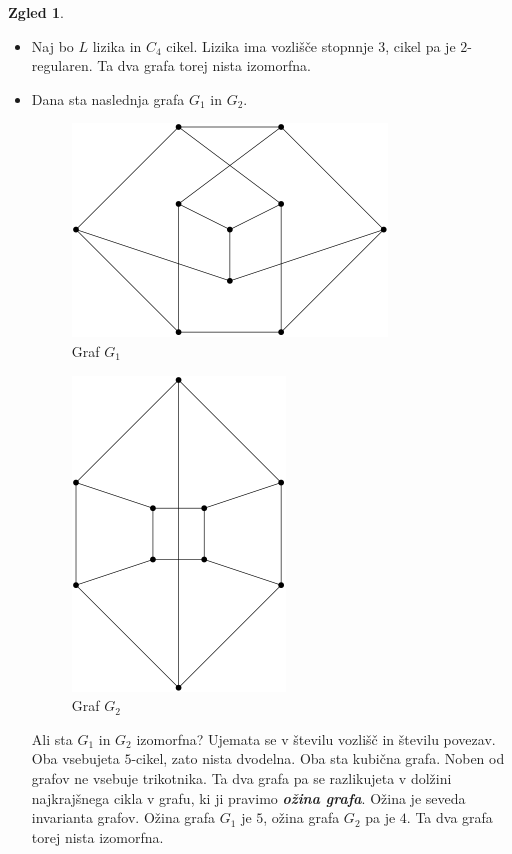 \documentclass[11pt]{book}
\def\definicija{\color{rdeca}\bf\em}
\theoremstyle{definition}
\theoremstyle{zgled}
\newtheorem*{zgled}{Zgled}
\theoremstyle{odprtproblem}
\theoremstyle{domacanaloga}
\theoremstyle{izrek}
\begin{document}
\begin{zgled} \leavevmode
    \begin{itemize}
        \item Naj bo $L$ lizika in $C_4$ cikel. Lizika ima vozlišče stopnnje $3$, cikel pa je $2$-regularen. Ta dva grafa torej nista izomorfna.
        
        \item Dana sta naslednja grafa $G_1$ in $G_2$.
        
        \begin{figure}[h]
            \centering
            \includegraphics[width=0.5\linewidth]{img/grafi-zanimiv-zgled.png}
            \caption{Graf $G_1$}
        \end{figure}

        \begin{figure}[h]
            \centering
            \includegraphics[width=0.5\linewidth]{img/grafi-primerjava.png}
            \caption{Graf $G_2$}
        \end{figure}

        Ali sta $G_1$ in $G_2$ izomorfna? Ujemata se v številu vozlišč in številu povezav. Oba vsebujeta $5$-cikel, zato nista dvodelna. Oba sta kubična grafa. Noben od grafov ne vsebuje trikotnika. Ta dva grafa pa se razlikujeta v dolžini najkrajšnega cikla v grafu, ki ji pravimo {\definicija ožina grafa}. Ožina je seveda invarianta grafov. Ožina grafa $G_1$ je $5$, ožina grafa $G_2$ pa je $4$. Ta dva grafa torej nista izomorfna.
    \end{itemize}
\end{zgled}
\end{document}
